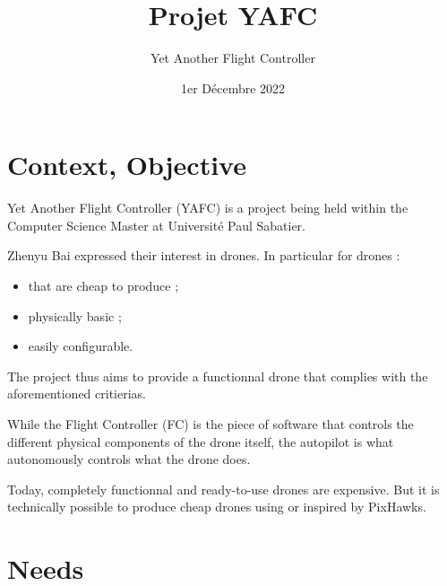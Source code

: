 \documentclass{beamer}
\title[YAFC]{Projet YAFC}
\subtitle{Yet Another Flight Controller}
\author[OYEZ]{Oussama Felfel \and
Yasmine Benhaddou\texorpdfstring{\\} \and
Elana Courtines \and
Zineb Moubarik}
\institute[UT3]{Université Paul Sabatier}
\date[01/12/2022]{1er Décembre 2022}
\begin{document}
\frame{\titlepage}


\section{Context, Objective}

\begin{frame}
    Yet Another Flight Controller (YAFC) is a project being held within the Computer Science Master at Université Paul Sabatier.

    \vspace*{5mm}

    Zhenyu Bai expressed their interest in drones. In particular for drones :
    \begin{itemize}
        \item that are cheap to produce ;
        \item physically basic ; 
        \item easily configurable.
    \end{itemize}
    
    \vspace*{5mm}

    The project thus aims to provide a functionnal drone that complies with the aforementioned critierias.
\end{frame}

\begin{frame}
    While the Flight Controller (FC) is the piece of software that controls the different physical components of the drone itself, the autopilot is what autonomously controls what the drone does.

    \vspace*{5mm}

    Today, completely functionnal and ready-to-use drones are expensive. But it is technically possible to produce cheap drones using or inspired by PixHawks.

\end{frame}

\section{Needs}
\end{document}
